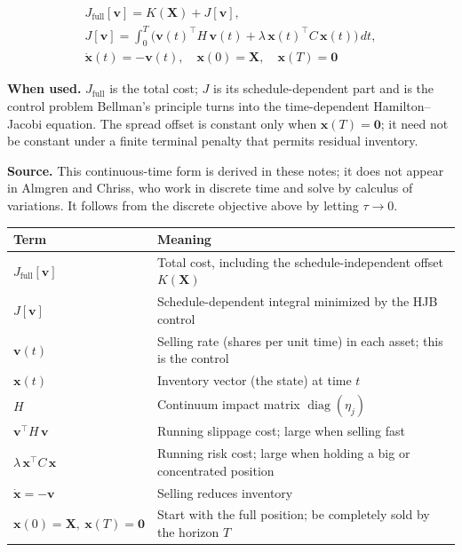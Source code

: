 \documentclass[11pt,a4paper]{article}
\begin{document}
    \begin{equation}
    \begin{gathered}
    J_{\mathrm{full}}[\mathbf{v}]=K(\mathbf X)+J[\mathbf v],\\
    J[\mathbf{v}]
    = \int_0^T \Big( \mathbf{v}(t)^\top H\,\mathbf{v}(t)
        + \lambda\,\mathbf{x}(t)^\top C\,\mathbf{x}(t) \Big)\,dt,
    \\\dot{\mathbf{x}}(t) = -\mathbf{v}(t),
    \quad \mathbf{x}(0)=\mathbf{X},\quad \mathbf{x}(T)=\mathbf{0}
    \end{gathered}
    \end{equation}

    \textbf{When used.} $J_{\mathrm{full}}$ is the total cost; $J$ is its
    schedule-dependent part and is the control problem Bellman's principle turns
    into the time-dependent Hamilton--Jacobi equation. The spread offset is
    constant only when $\mathbf{x}(T)=\mathbf 0$; it need not be constant under a
    finite terminal penalty that permits residual inventory.

    \textbf{Source.} This continuous-time form is derived in these notes; it does not
    appear in Almgren and Chriss, who work in discrete time and solve by calculus of
    variations. It follows from the discrete objective above by letting $\tau\to0$.

    \begin{center}
    \begin{tabular}{@{}L{3.8cm}L{10cm}@{}}
    \toprule
    \textbf{Term} & \textbf{Meaning} \\
    \midrule
    $J_{\mathrm{full}}[\mathbf{v}]$ & Total cost, including the schedule-independent offset $K(\mathbf X)$ \\
    $J[\mathbf{v}]$ & Schedule-dependent integral minimized by the HJB control \\
    $\mathbf{v}(t)$ & Selling rate (shares per unit time) in each asset; this is the control \\
    $\mathbf{x}(t)$ & Inventory vector (the state) at time $t$ \\
    $H$ & Continuum impact matrix $\operatorname{diag}(\eta_j)$ \\
    $\mathbf{v}^\top H\,\mathbf{v}$ & Running slippage cost; large when selling fast \\
    $\lambda\,\mathbf{x}^\top C\,\mathbf{x}$ & Running risk cost; large when holding a big or concentrated position \\
    $\dot{\mathbf{x}}=-\mathbf{v}$ & Selling reduces inventory \\
    $\mathbf{x}(0)=\mathbf{X},\ \mathbf{x}(T)=\mathbf{0}$ & Start with the full position; be completely sold by the horizon $T$ \\
    \bottomrule
    \end{tabular}
    \end{center}

    
\end{document}
